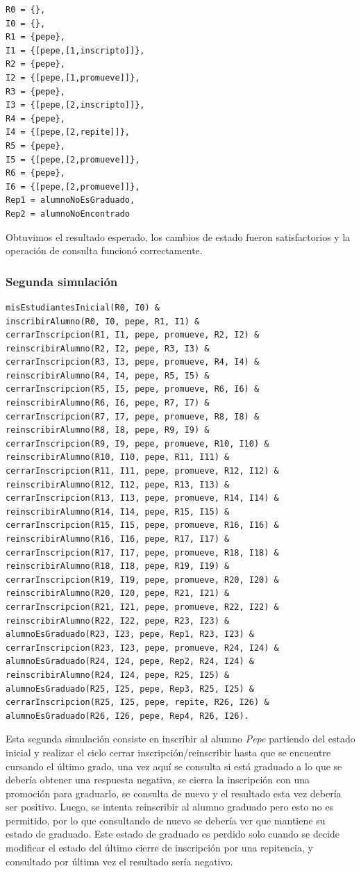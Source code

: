 \documentclass{article}
\begin{document}
\begin{verbatim}
R0 = {},  
I0 = {},  
R1 = {pepe},  
I1 = {[pepe,[1,inscripto]]},  
R2 = {pepe},  
I2 = {[pepe,[1,promueve]]},  
R3 = {pepe},  
I3 = {[pepe,[2,inscripto]]},  
R4 = {pepe},  
I4 = {[pepe,[2,repite]]},  
R5 = {pepe},  
I5 = {[pepe,[2,promueve]]},  
R6 = {pepe},  
I6 = {[pepe,[2,promueve]]},  
Rep1 = alumnoNoEsGraduado,  
Rep2 = alumnoNoEncontrado
\end{verbatim}

Obtuvimos el resultado esperado, los cambios de estado fueron satisfactorios y la operación de consulta funcionó correctamente.

\subsubsection*{Segunda simulación}
\begin{verbatim}
misEstudiantesInicial(R0, I0) &
inscribirAlumno(R0, I0, pepe, R1, I1) &
cerrarInscripcion(R1, I1, pepe, promueve, R2, I2) &
reinscribirAlumno(R2, I2, pepe, R3, I3) &
cerrarInscripcion(R3, I3, pepe, promueve, R4, I4) &
reinscribirAlumno(R4, I4, pepe, R5, I5) &
cerrarInscripcion(R5, I5, pepe, promueve, R6, I6) &
reinscribirAlumno(R6, I6, pepe, R7, I7) &
cerrarInscripcion(R7, I7, pepe, promueve, R8, I8) &
reinscribirAlumno(R8, I8, pepe, R9, I9) &
cerrarInscripcion(R9, I9, pepe, promueve, R10, I10) &
reinscribirAlumno(R10, I10, pepe, R11, I11) &
cerrarInscripcion(R11, I11, pepe, promueve, R12, I12) &
reinscribirAlumno(R12, I12, pepe, R13, I13) &
cerrarInscripcion(R13, I13, pepe, promueve, R14, I14) &
reinscribirAlumno(R14, I14, pepe, R15, I15) &
cerrarInscripcion(R15, I15, pepe, promueve, R16, I16) &
reinscribirAlumno(R16, I16, pepe, R17, I17) &
cerrarInscripcion(R17, I17, pepe, promueve, R18, I18) &
reinscribirAlumno(R18, I18, pepe, R19, I19) &
cerrarInscripcion(R19, I19, pepe, promueve, R20, I20) &
reinscribirAlumno(R20, I20, pepe, R21, I21) &
cerrarInscripcion(R21, I21, pepe, promueve, R22, I22) &
reinscribirAlumno(R22, I22, pepe, R23, I23) &
alumnoEsGraduado(R23, I23, pepe, Rep1, R23, I23) &
cerrarInscripcion(R23, I23, pepe, promueve, R24, I24) &
alumnoEsGraduado(R24, I24, pepe, Rep2, R24, I24) &
reinscribirAlumno(R24, I24, pepe, R25, I25) &
alumnoEsGraduado(R25, I25, pepe, Rep3, R25, I25) &
cerrarInscripcion(R25, I25, pepe, repite, R26, I26) &
alumnoEsGraduado(R26, I26, pepe, Rep4, R26, I26).
\end{verbatim}

Esta segunda simulación consiste en inscribir al alumno \emph{Pepe} partiendo del estado inicial y realizar el ciclo cerrar inscripción/reinscribir hasta que se encuentre cursando el último grado, una vez aquí se consulta si está graduado a lo que se debería obtener una respuesta negativa, se cierra la inscripción con una promoción para graduarlo, se consulta de nuevo y el resultado esta vez debería ser positivo. Luego, se intenta reinscribir al alumno graduado pero esto no es permitido, por lo que consultando de nuevo se debería ver que mantiene su estado de graduado. Este estado de graduado es perdido solo cuando se decide modificar el estado del último cierre de inscripción por una repitencia, y consultado por última vez el resultado sería negativo.
\end{document}
